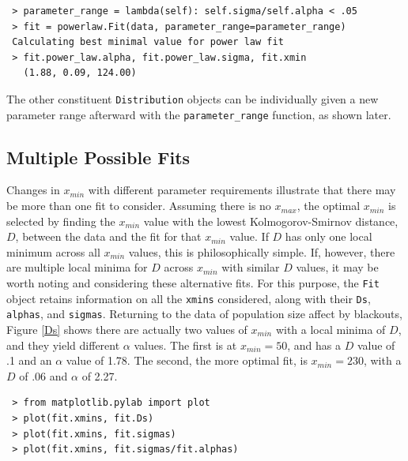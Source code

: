\documentclass[10pt]{article}
\begin{document}
 \begin{verbatim}
 > parameter_range = lambda(self): self.sigma/self.alpha < .05
 > fit = powerlaw.Fit(data, parameter_range=parameter_range)
 Calculating best minimal value for power law fit
 > fit.power_law.alpha, fit.power_law.sigma, fit.xmin
   (1.88, 0.09, 124.00)  
 \end{verbatim}
 
 The other constituent \verb"Distribution" objects can be individually given a new parameter range afterward with the \verb$parameter_range$ function, as shown later.
 
 \subsection*{Multiple Possible Fits}
 Changes in $x_{min}$ with different parameter requirements illustrate that there may be more than one fit to consider. Assuming there is no $x_{max}$, the optimal $x_{min}$ is selected by finding the $x_{min}$ value with the lowest Kolmogorov-Smirnov distance, $D$, between the data and the fit for that $x_{min}$ value. If $D$ has only one local minimum across all $x_{min}$ values, this is philosophically simple. If, however, there are multiple local minima for $D$ across $x_{min}$ with similar $D$ values, it may be worth noting and considering these alternative fits. For this purpose, the \verb$Fit$ object retains information on all the \verb$xmins$ considered, along with their \verb$Ds$, \verb$alphas$, and \verb$sigmas$. Returning to the data of population size affect by blackouts, Figure \ref{Ds} shows there are actually two values of $x_{min}$ with a local minima of $D$, and they yield different $\alpha$ values. The first is at $x_{min}=50$, and has a $D$ value of .1 and an $\alpha$ value of 1.78. The second, the more optimal fit, is $x_{min}=230$, with a $D$ of .06 and $\alpha$ of 2.27.
 
 \begin{verbatim}
 > from matplotlib.pylab import plot
 > plot(fit.xmins, fit.Ds)
 > plot(fit.xmins, fit.sigmas)
 > plot(fit.xmins, fit.sigmas/fit.alphas)
 \end{verbatim}
 
\end{document}
